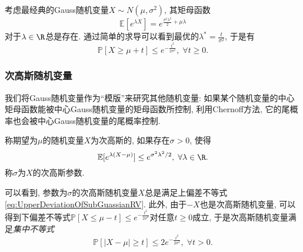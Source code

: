 \begin{example}[Gauss随机变量的上偏差不等式]
	考虑最经典的Gauss随机变量$X \sim N(\mu, \sigma^2)$, 其矩母函数
	\begin{equation}
		\mathbb{E}[e^{\lambda X}] = e^{\frac{\sigma^2 \lambda^2}{2} + \mu \lambda} 		
	\end{equation}
	对于$\lambda \in \R$总是存在. 
	通过简单的求导可以看到最优的$\lambda^* = \frac{t}{\sigma^2}$, 于是有
	\begin{equation}\label{eq:UpperDeviationOfSubGuassianRV}
		\mathbb{P}[X \geq \mu + t] \leq e^{- \frac{t^2}{2 \sigma^2}},\; \forall t \geq 0. 
	\end{equation}
\end{example}

\subsubsection{次高斯随机变量}

我们将Gauss随机变量作为“模版”来研究其他随机变量: 如果某个随机变量的中心矩母函数能被中心Gauss随机变量的矩母函数所控制, 利用Chernoff方法, 它的尾概率也会被中心Gauss随机变量的尾概率控制. 

\begin{definition}[次高斯随机变量]
	称期望为$\mu$的随机变量$X$为次高斯的, 如果存在$\sigma > 0$, 使得
	\begin{equation*}
		\mathbb{E}[e^{\lambda(X - \mu)}] \leq e^{\sigma^2 \lambda^2 /2},\; \forall \lambda \in \R. 
	\end{equation*}
	称$\sigma$为$X$的次高斯参数. 
\end{definition}
可以看到, 参数为$\sigma$的次高斯随机变量$X$总是满足上偏差不等式 \eqref{eq:UpperDeviationOfSubGuassianRV}.  
此外, 由于$-X$也是次高斯随机变量, 可以得到下偏差不等式$\mathbb{P}[X \leq \mu - t] \leq e^{- \frac{t^2}{2 \sigma^2}}$对任意$t \geq 0$成立, 于是次高斯随机变量满足\emph{集中不等式}
\begin{equation}\label{eq:SubGuassianConcentration}
	\mathbb{P}[|X - \mu| \geq t] \leq 2 e^{- \frac{t^2}{2 \sigma^2}},\; \forall t > 0. 
\end{equation}

